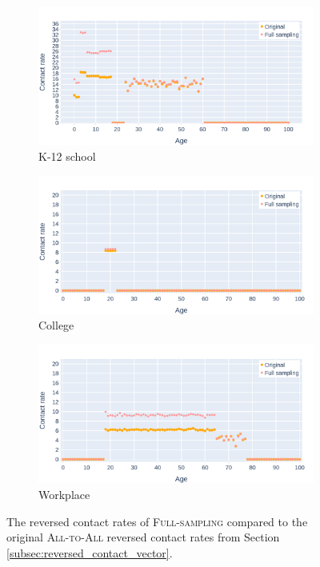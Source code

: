 \begin{figure}
    \centering
    \begin{subfigure}{.8\linewidth}
        \centering
        \includegraphics[width=\textwidth]{4 - Sampling/fig/full_sampling/fs_pType_vs_standard_reverse_cr_k12school.png}
        \caption{K-12 school}
        \label{fig:fs_pType_vs_standard_reversed_cr_k12school}
    \end{subfigure}
    \begin{subfigure}{.8\linewidth}
        \centering
        \includegraphics[width=\textwidth]{4 - Sampling/fig/full_sampling/fs_pType_vs_standard_reverse_cr_college.png}
        \caption{College}
        \label{fig:fs_pType_vs_standard_reversed_cr_college}
    \end{subfigure}
    \begin{subfigure}{.8\linewidth}
        \centering
        \includegraphics[width=\textwidth]{4 - Sampling/fig/full_sampling/fs_pType_vs_standard_reverse_cr_workplace.png}
        \caption{Workplace}
        \label{fig:fs_pType_vs_standard_reversed_cr_workplace}
    \end{subfigure}
    \caption{The reversed contact rates of \textsc{Full-sampling} compared to the original \textsc{All-to-All} reversed contact rates from Section \ref{subsec:reversed_contact_vector}.}
\end{figure}
